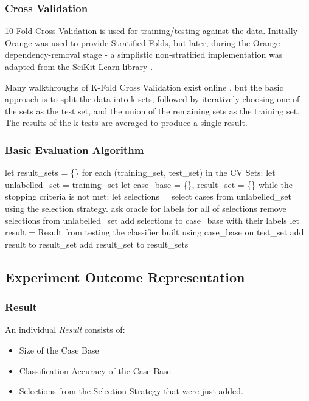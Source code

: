 \documentclass[a4paper,11pt]{report}
\begin{document}
\subsubsection{Cross Validation}

10-Fold Cross Validation is used for training/testing against the data. Initially Orange was used to provide Stratified Folds, but later, during the Orange-dependency-removal stage - a simplistic non-stratified implementation was adapted from the SciKit Learn library \citep{prog:sklearn}.

Many walkthroughs of K-Fold Cross Validation exist online \citep{web:kfolddemo}, but the basic approach is to split the data into k sets, followed by iteratively choosing one of the sets as the test set, and the union of the remaining sets as the training set. The results of the k tests are averaged to produce a single result.

\subsubsection{Basic Evaluation Algorithm}
\nopagebreak[4]
\begin{code}
let result_sets = \{\}
for each (training_set, test_set) in the CV Sets:
  let unlabelled_set = training_set
  let case_base = \{\}, result_set = \{\}
  while the stopping criteria is not met:
    let selections = select cases from unlabelled_set using 
                     the selection strategy.
    ask oracle for labels for all of selections
    remove selections from unlabelled_set
    add selections to case_base with their labels
    let result = Result from testing the classifier
                 built using case_base on test_set
    add result to result_set
  add result_set to result_sets
\end{code}

\subsection{Experiment Outcome Representation}
\subsubsection{Result}
An individual \emph{Result} consists of:
\begin{itemize}
	\item Size of the Case Base
	\item Classification Accuracy of the Case Base
	\item Selections from the Selection Strategy that were just added.
\end{itemize}
\end{document}
